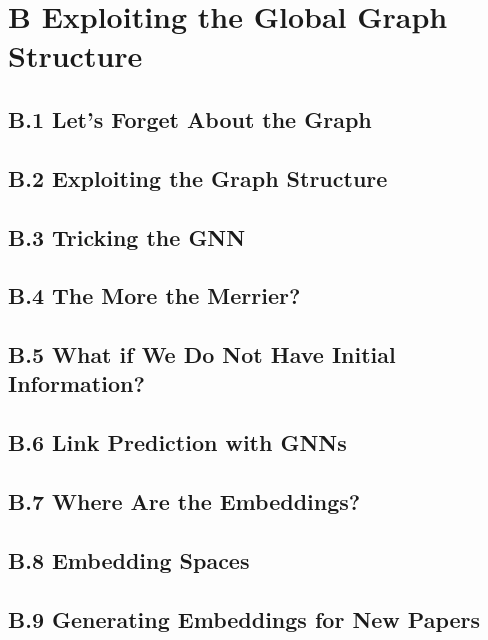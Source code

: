 \documentclass{article}
\begin{document}
\section*{B \hspace{0.5em} Exploiting the Global Graph Structure}

\subsection*{B.1 \hspace{0.3em} Let's Forget About the Graph}

\subsection*{B.2 \hspace{0.3em} Exploiting the Graph Structure}

\subsection*{B.3 \hspace{0.3em} Tricking the GNN}

\subsection*{B.4 \hspace{0.3em} The More the Merrier?}

\subsection*{B.5 \hspace{0.3em} What if We Do Not Have Initial Information?}

\subsection*{B.6 \hspace{0.3em} Link Prediction with GNNs}

\subsection*{B.7 \hspace{0.3em} Where Are the Embeddings?}

\subsection*{B.8 \hspace{0.3em} Embedding Spaces}

\subsection*{B.9 \hspace{0.3em} Generating Embeddings for New Papers}
\end{document}

